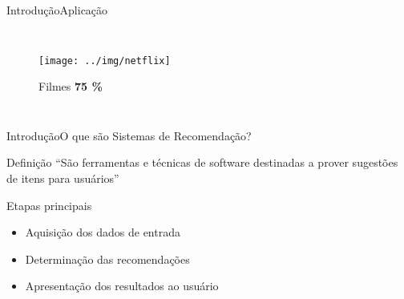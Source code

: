 \begin{frame}{Introdução}{Aplicação}
\begin{columns}[b]
\begin{figure}[ht]
    \begin{center}
    \texttt{[image: ../img/netflix]}

    Filmes \textbf{75 \%} \\
    \cite{netflix75}
    \end{center}
\end{figure}
\end{columns}
\end{frame}




\begin{frame}{Introdução}{O que são Sistemas de Recomendação?}
\begin{block}{Definição}
``São ferramentas e técnicas de software destinadas a prover sugestões de itens para usuários'' \cite{ricci2011introduction-chap1}
\end{block}

\begin{block}{Etapas principais}
\begin{itemize}
    \item Aquisição dos dados de entrada
    \item Determinação das recomendações
    \item Apresentação dos resultados ao usuário
\end{itemize}
\end{block}
\end{frame}